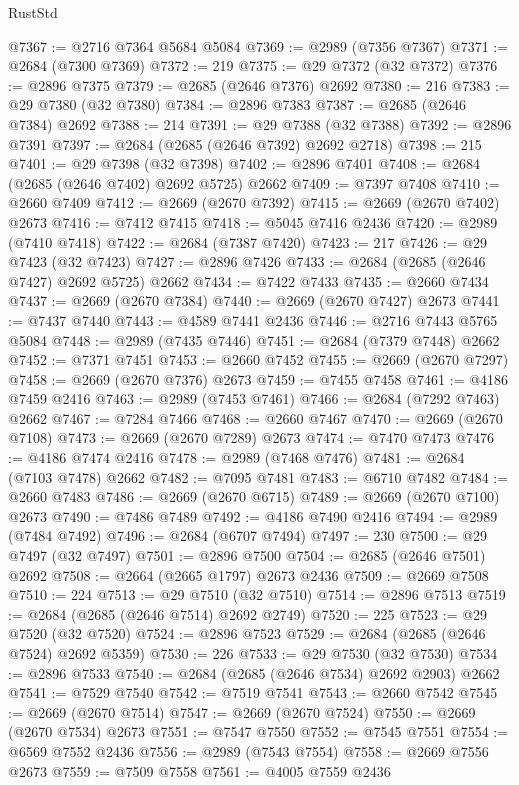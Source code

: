 \begin{lexlean}{RustStd}
\begin{coremodule}
@7367 := @2716 @7364 @5684 @5084
@7369 := @2989 (@7356 @7367)
@7371 := @2684 (@7300 @7369)
@7372 := 219
@7375 := @29 @7372 (@32 @7372)
@7376 := @2896 @7375
@7379 := @2685 (@2646 @7376) @2692
@7380 := 216
@7383 := @29 @7380 (@32 @7380)
@7384 := @2896 @7383
@7387 := @2685 (@2646 @7384) @2692
@7388 := 214
@7391 := @29 @7388 (@32 @7388)
@7392 := @2896 @7391
@7397 := @2684 (@2685 (@2646 @7392) @2692 @2718)
@7398 := 215
@7401 := @29 @7398 (@32 @7398)
@7402 := @2896 @7401
@7408 := @2684 (@2685 (@2646 @7402) @2692 @5725) @2662
@7409 := @7397 @7408
@7410 := @2660 @7409
@7412 := @2669 (@2670 @7392)
@7415 := @2669 (@2670 @7402) @2673
@7416 := @7412 @7415
@7418 := @5045 @7416 @2436
@7420 := @2989 (@7410 @7418)
@7422 := @2684 (@7387 @7420)
@7423 := 217
@7426 := @29 @7423 (@32 @7423)
@7427 := @2896 @7426
@7433 := @2684 (@2685 (@2646 @7427) @2692 @5725) @2662
@7434 := @7422 @7433
@7435 := @2660 @7434
@7437 := @2669 (@2670 @7384)
@7440 := @2669 (@2670 @7427) @2673
@7441 := @7437 @7440
@7443 := @4589 @7441 @2436
@7446 := @2716 @7443 @5765 @5084
@7448 := @2989 (@7435 @7446)
@7451 := @2684 (@7379 @7448) @2662
@7452 := @7371 @7451
@7453 := @2660 @7452
@7455 := @2669 (@2670 @7297)
@7458 := @2669 (@2670 @7376) @2673
@7459 := @7455 @7458
@7461 := @4186 @7459 @2416
@7463 := @2989 (@7453 @7461)
@7466 := @2684 (@7292 @7463) @2662
@7467 := @7284 @7466
@7468 := @2660 @7467
@7470 := @2669 (@2670 @7108)
@7473 := @2669 (@2670 @7289) @2673
@7474 := @7470 @7473
@7476 := @4186 @7474 @2416
@7478 := @2989 (@7468 @7476)
@7481 := @2684 (@7103 @7478) @2662
@7482 := @7095 @7481
@7483 := @6710 @7482
@7484 := @2660 @7483
@7486 := @2669 (@2670 @6715)
@7489 := @2669 (@2670 @7100) @2673
@7490 := @7486 @7489
@7492 := @4186 @7490 @2416
@7494 := @2989 (@7484 @7492)
@7496 := @2684 (@6707 @7494)
@7497 := 230
@7500 := @29 @7497 (@32 @7497)
@7501 := @2896 @7500
@7504 := @2685 (@2646 @7501) @2692
@7508 := @2664 (@2665 @1797) @2673 @2436
@7509 := @2669 @7508
@7510 := 224
@7513 := @29 @7510 (@32 @7510)
@7514 := @2896 @7513
@7519 := @2684 (@2685 (@2646 @7514) @2692 @2749)
@7520 := 225
@7523 := @29 @7520 (@32 @7520)
@7524 := @2896 @7523
@7529 := @2684 (@2685 (@2646 @7524) @2692 @5359)
@7530 := 226
@7533 := @29 @7530 (@32 @7530)
@7534 := @2896 @7533
@7540 := @2684 (@2685 (@2646 @7534) @2692 @2903) @2662
@7541 := @7529 @7540
@7542 := @7519 @7541
@7543 := @2660 @7542
@7545 := @2669 (@2670 @7514)
@7547 := @2669 (@2670 @7524)
@7550 := @2669 (@2670 @7534) @2673
@7551 := @7547 @7550
@7552 := @7545 @7551
@7554 := @6569 @7552 @2436
@7556 := @2989 (@7543 @7554)
@7558 := @2669 @7556 @2673
@7559 := @7509 @7558
@7561 := @4005 @7559 @2436

\end{coremodule}
\end{lexlean}
